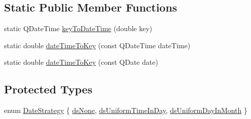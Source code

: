 \subsection*{Static Public Member Functions}
\begin{DoxyCompactItemize}
\item 
static Q\+Date\+Time \mbox{\hyperlink{class_q_c_p_axis_ticker_date_time_a4c1761ad057f5564804a53f942629b53}{key\+To\+Date\+Time}} (double key)
\item 
static double \mbox{\hyperlink{class_q_c_p_axis_ticker_date_time_aa24f293f16fff0f937bf71f4140033f1}{date\+Time\+To\+Key}} (const Q\+Date\+Time date\+Time)
\item 
static double \mbox{\hyperlink{class_q_c_p_axis_ticker_date_time_ad87afc7dba65843f68da5ca88bc004f4}{date\+Time\+To\+Key}} (const Q\+Date date)
\end{DoxyCompactItemize}
\subsection*{Protected Types}
\begin{DoxyCompactItemize}
\item 
enum \mbox{\hyperlink{class_q_c_p_axis_ticker_date_time_af2c7c60821a6234ca7a172f42ef7f1d8}{Date\+Strategy}} \{ \mbox{\hyperlink{class_q_c_p_axis_ticker_date_time_af2c7c60821a6234ca7a172f42ef7f1d8a02076ab726129e1ab9e0f999d4314309}{ds\+None}}, 
\mbox{\hyperlink{class_q_c_p_axis_ticker_date_time_af2c7c60821a6234ca7a172f42ef7f1d8a39644957223102224f35662da3ab1a14}{ds\+Uniform\+Time\+In\+Day}}, 
\mbox{\hyperlink{class_q_c_p_axis_ticker_date_time_af2c7c60821a6234ca7a172f42ef7f1d8a7889e1531db9ce1c5d8957b4f0de58ad}{ds\+Uniform\+Day\+In\+Month}}
 \}
\end{DoxyCompactItemize}
